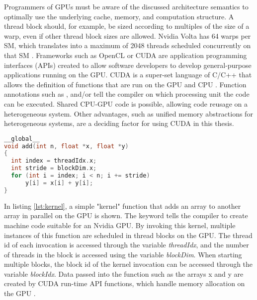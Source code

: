 Programmers of GPUs must be aware of the discussed architecture semantics to optimally use the underlying cache, memory, and computation structure. A thread block should, for example, be sized according to multiples of the size of a warp, even if other thread block sizes are allowed. Nvidia Volta has 64 warps per SM, which translates into a maximum of 2048 threads scheduled concurrently on that SM \cite{NVIDIATESLAV1002017}.
Frameworks such as OpenCL or CUDA are application programming interfaces (APIs) created to allow software developers to develop general-purpose applications running on the GPU. CUDA is a super-set language of C/C++ that allows the definition of functions that are run on the GPU and CPU \cite{EasyIntroductionCUDA2012,nickollsScalableParallelProgramming2008,sosuthaHeterogeneousParallelComputing2015}. Function annotations such as \texttt{}, \texttt{} and/or \texttt{} tell the compiler on which processing unit the code can be executed. Shared CPU-GPU code is possible, allowing code reusage on a heterogeneous system. Other advantages, such as unified memory abstractions for heterogeneous systems, are a deciding factor for using CUDA in this thesis.

\begin{lstlisting}[language=C++, caption=CUDA kernel example \cite{EasyIntroductionCUDA2012}, label=lst:kernel]
__global__
void add(int n, float *x, float *y)
{
  int index = threadIdx.x;
  int stride = blockDim.x;
  for (int i = index; i < n; i += stride)
      y[i] = x[i] + y[i];
}
\end{lstlisting}
In listing \ref{lst:kernel}, a simple "kernel" function that adds an array to another array in parallel on the GPU is shown. The \texttt{} keyword tells the compiler to create machine code suitable for an Nvidia GPU. By invoking this kernel, multiple instances of this function are scheduled in thread blocks on the GPU. The thread id of each invocation is accessed through the variable \emph{threadIdx}, and the number of threads in the block is accessed using the variable \emph{blockDim}. When starting multiple blocks, the block id of the kernel invocation can be accessed through the variable \emph{blockIdx}.
Data passed into the function such as the arrays x and y are created by CUDA run-time API functions, which handle memory allocation on the GPU \cite{MemoryManagement}.


